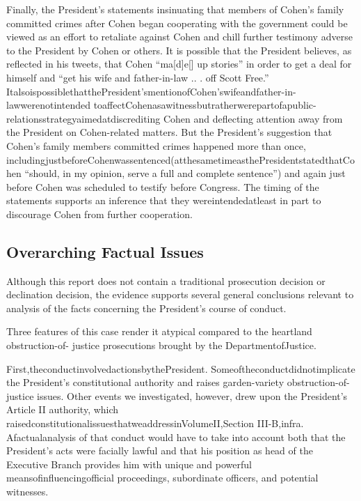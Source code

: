 {Finally, the President's statements insinuating that members of Cohen's family committed crimes after Cohen began cooperating with the government could be viewed as an effort to retaliate against Cohen and chill further testimony adverse to the President by Cohen or others. It is possible that the President believes, as reflected in his tweets, that Cohen “ma[d]e[] up stories” in order to get a deal for himself and “get his wife and father-in-law .. . off Scott Free.” ItalsoispossiblethatthePresident'smentionofCohen'swifeandfather-in-lawwerenotintended toaffectCohenasawitnessbutratherwerepartofapublic-relationsstrategyaimedatdiscrediting Cohen and deflecting attention away from the President on Cohen-related matters. But the President's suggestion that Cohen's family members committed crimes happened more than once, includingjustbeforeCohenwassentenced(atthesametimeasthePresidentstatedthatCohen “should, in my opinion, serve a full and complete sentence”) and again just before Cohen was scheduled to testify before Congress. The timing of the statements supports an inference that they wereintendedatleast in part to discourage Cohen from further cooperation.

\subsection{Overarching Factual Issues}

Although this report does not contain a traditional prosecution decision or declination decision, the evidence supports several general conclusions relevant to analysis of the facts concerning the President's course of conduct.

Three features of this case render it atypical compared to the heartland obstruction-of- justice prosecutions brought by the DepartmentofJustice.

First,theconductinvolvedactionsbythePresident. Someoftheconductdidnotimplicate the President's constitutional authority and raises garden-variety obstruction-of-justice issues. Other events we investigated, however, drew upon the President's Article II authority, which raisedconstitutionalissuesthatweaddressinVolumeII,Section III-B,infra. Afactualanalysis of that conduct would have to take into account both that the President's acts were facially lawful and that his position as head of the Executive Branch provides him with unique and powerful meansofinfluencingofficial proceedings, subordinate officers, and potential witnesses.

}
